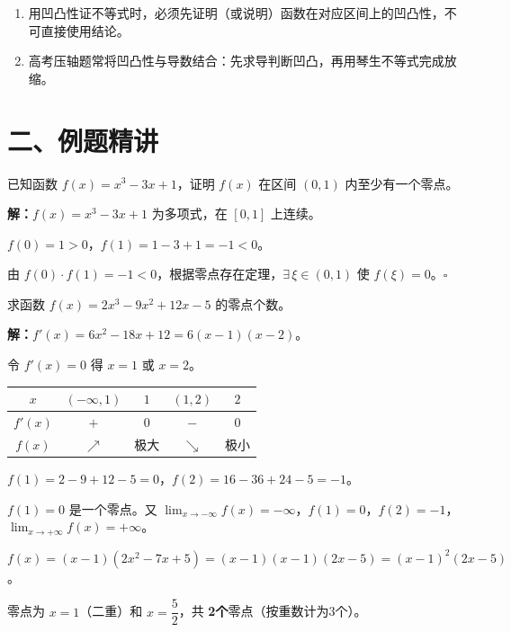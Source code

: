 \documentclass[12pt, a4paper]{ctexart}
\begin{document}
\begin{warnbox}[高考实战提醒]
\begin{enumerate}[leftmargin=1.5em]
  \item 用凹凸性证不等式时，必须先证明（或说明）函数在对应区间上的凹凸性，不可直接使用结论。
  \item 高考压轴题常将凹凸性与导数结合：先求导判断凹凸，再用琴生不等式完成放缩。
\end{enumerate}
\end{warnbox}

\section*{\textcolor{examorange}{二、例题精讲}}

\begin{examplebox}[【例题1】零点存在性判断]
已知函数 $f(x)=x^3-3x+1$，证明 $f(x)$ 在区间 $(0,1)$ 内至少有一个零点。
\end{examplebox}

\textbf{解：}\quad $f(x)=x^3-3x+1$ 为多项式，在 $[0,1]$ 上连续。\par
$f(0)=1>0$，$f(1)=1-3+1=-1<0$。\par
由 $f(0)\cdot f(1)=-1<0$，根据零点存在定理，$\exists\,\xi\in(0,1)$ 使 $f(\xi)=0$。\hfill$\square$

\begin{examplebox}[【例题2】零点个数问题]
求函数 $f(x)=2x^3-9x^2+12x-5$ 的零点个数。
\end{examplebox}

\textbf{解：}\quad $f'(x)=6x^2-18x+12=6(x-1)(x-2)$。\par
令 $f'(x)=0$ 得 $x=1$ 或 $x=2$。\par
\begin{center}
\begin{tabular}{c|cccc}
$x$ & $(-\infty,1)$ & $1$ & $(1,2)$ & $2$ \\ \hline
$f'(x)$ & $+$ & $0$ & $-$ & $0$ \\
$f(x)$ & $\nearrow$ & 极大 & $\searrow$ & 极小
\end{tabular}
\end{center}
$f(1)=2-9+12-5=0$，$f(2)=16-36+24-5=-1$。\par
$f(1)=0$ 是一个零点。又 $\lim_{x\to -\infty}f(x)=-\infty$，$f(1)=0$，$f(2)=-1$，$\lim_{x\to+\infty}f(x)=+\infty$。\par
$f(x)=(x-1)(2x^2-7x+5)=(x-1)(x-1)(2x-5)=(x-1)^2(2x-5)$。\par
零点为 $x=1$（二重）和 $x=\dfrac{5}{2}$，共 \textbf{2个}零点（按重数计为3个）。
\end{document}
